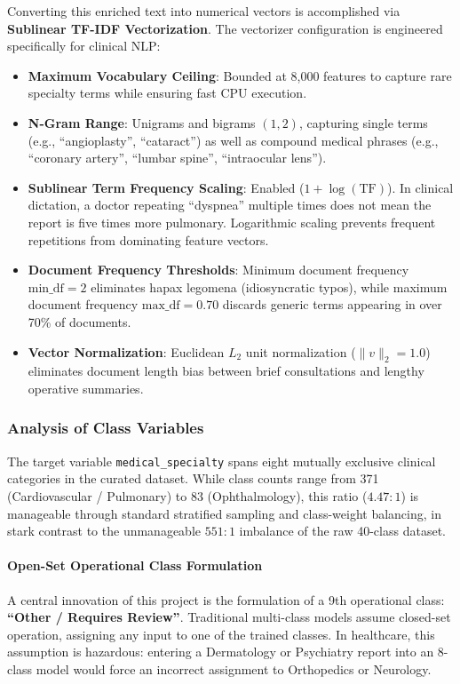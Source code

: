 Converting this enriched text into numerical vectors is accomplished via \textbf{Sublinear TF-IDF Vectorization}. The vectorizer configuration is engineered specifically for clinical NLP:
\begin{itemize}
    \item \textbf{Maximum Vocabulary Ceiling}: Bounded at 8,000 features to capture rare specialty terms while ensuring fast CPU execution.
    \item \textbf{N-Gram Range}: Unigrams and bigrams $(1, 2)$, capturing single terms (e.g., ``angioplasty'', ``cataract'') as well as compound medical phrases (e.g., ``coronary artery'', ``lumbar spine'', ``intraocular lens'').
    \item \textbf{Sublinear Term Frequency Scaling}: Enabled ($1 + \log(\text{TF})$). In clinical dictation, a doctor repeating ``dyspnea'' multiple times does not mean the report is five times more pulmonary. Logarithmic scaling prevents frequent repetitions from dominating feature vectors.
    \item \textbf{Document Frequency Thresholds}: Minimum document frequency $\text{min\_df} = 2$ eliminates hapax legomena (idiosyncratic typos), while maximum document frequency $\text{max\_df} = 0.70$ discards generic terms appearing in over 70\% of documents.
    \item \textbf{Vector Normalization}: Euclidean $L_2$ unit normalization ($\|v\|_2 = 1.0$) eliminates document length bias between brief consultations and lengthy operative summaries.
\end{itemize}

\subsubsection{Analysis of Class Variables}
The target variable \texttt{medical\_specialty} spans eight mutually exclusive clinical categories in the curated dataset. While class counts range from 371 (Cardiovascular / Pulmonary) to 83 (Ophthalmology), this ratio ($4.47:1$) is manageable through standard stratified sampling and class-weight balancing, in stark contrast to the unmanageable $551:1$ imbalance of the raw 40-class dataset.

\paragraph{Open-Set Operational Class Formulation}
A central innovation of this project is the formulation of a 9th operational class: \textbf{``Other / Requires Review''}. Traditional multi-class models assume closed-set operation, assigning any input to one of the trained classes. In healthcare, this assumption is hazardous: entering a Dermatology or Psychiatry report into an 8-class model would force an incorrect assignment to Orthopedics or Neurology.

